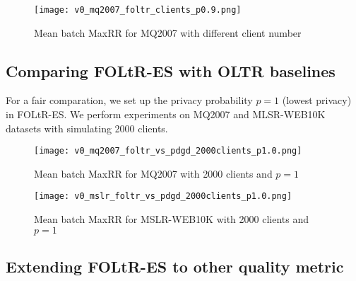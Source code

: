 \begin{figure}[H]
	\centering
	\texttt{[image: v0\_mq2007\_foltr\_clients\_p0.9.png]}
	\caption{Mean batch MaxRR for MQ2007 with different client number}
	\label{fig: mq2007clients}
\end{figure}


\subsection{Comparing FOLtR-ES with OLTR baselines}

For a fair comparation, we set up the privacy probability $p = 1$ (lowest privacy) in FOLtR-ES. We perform experiments on MQ2007 and MLSR-WEB10K datasets with simulating 2000 clients.

\begin{figure}[H]
	\centering
	\texttt{[image: v0\_mq2007\_foltr\_vs\_pdgd\_2000clients\_p1.0.png]}
	\caption{Mean batch MaxRR for MQ2007 with 2000 clients and $p = 1$}
	\label{fig: mq2007-v0-baseline}
\end{figure}

\begin{figure}[H]
	\centering
	\texttt{[image: v0\_mslr\_foltr\_vs\_pdgd\_2000clients\_p1.0.png]}
	\caption{Mean batch MaxRR for MSLR-WEB10K with 2000 clients and $p = 1$}
	\label{fig: mslr-v0-baseline}
\end{figure}

\subsection{Extending FOLtR-ES to other quality metric}



